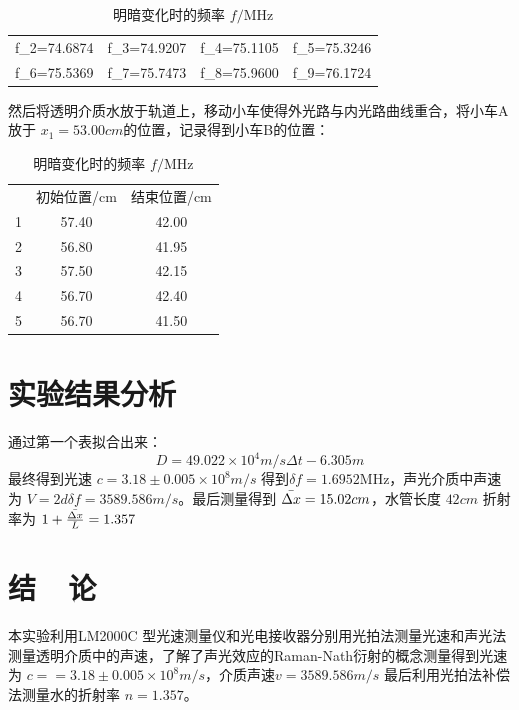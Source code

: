 \documentclass{buaaemp}
\begin{document}
\begin{table}[h]
\centering
\captionnamefont{\wuhao\bf\heiti}
\captiontitlefont{\wuhao\bf\heiti}
\caption{明暗变化时的频率 $f/\mathrm{MHz}$ } \label{tab:eg2}
\liuhao
\begin{tabular}{|c|c|c|c|}
\hline
 f_2=74.6874 & f_3=74.9207 & f_4=75.1105 &f_5=75.3246 \\
 f_6=75.5369 &f_7=75.7473 &f_8=75.9600 & f_9=76.1724 \\
\hline
\end{tabular}
\end{table}

然后将透明介质水放于轨道上，移动小车使得外光路与内光路曲线重合，将小车A放于 $x_1=53.00cm$的位置，记录得到小车B的位置：
\begin{table}[h]
\centering
\captionnamefont{\wuhao\bf\heiti}
\captiontitlefont{\wuhao\bf\heiti}
\caption{明暗变化时的频率 $f/\mathrm{MHz}$ } \label{tab:eg2}
\liuhao
\begin{tabular}{|c|c|c|}
\hline
 &初始位置/cm &结束位置/cm \\
1& 57.40&42.00 \\
2&56.80 & 41.95 \\
3& 57.50& 42.15 \\
4& 56.70& 42.40 \\
5& 56.70& 41.50 \\
\hline
\end{tabular}
\end{table}

\section{实验结果分析}
通过第一个表拟合出来：
$$D=49.022 \times 10^4 m/s \Delta t -6.305 m$$
最终得到光速 $c=3.18 \pm 0.005 \times 10^8 m/s$ 得到$ \delta f=1.6952 \mathrm{MHz}$，声光介质中声速为 $V=2d \delta f =3589.586 m/s$。最后测量得到 $\Bar{\Delta x}= 15.02cm$，水管长度 $42cm$ 折射率为 $1+\frac{\Bar{\Delta x}}{L}=1.357$



\section{结~~论}
本实验利用LM2000C 型光速测量仪和光电接收器分别用光拍法测量光速和声光法测量透明介质中的声速，了解了声光效应的Raman-Nath衍射的概念测量得到光速为 $c==3.18 \pm 0.005 \times 10^8 m/s$，介质声速$v=3589.586 m/s$ 最后利用光拍法补偿法测量水的折射率 $n=1.357$。



\renewcommand\refname{\heiti\wuhao\centerline{参考文献}\global\def\refname{参考文献}}
\vskip 12pt

\let\OLDthebibliography\thebibliography
\renewcommand\thebibliography[1]{
  \OLDthebibliography{#1}
  \setlength{\parskip}{0pt}
  \setlength{\itemsep}{0pt plus 0.3ex}
}

{
\renewcommand{\baselinestretch}{0.9}
\liuhao


}
\end{document}
